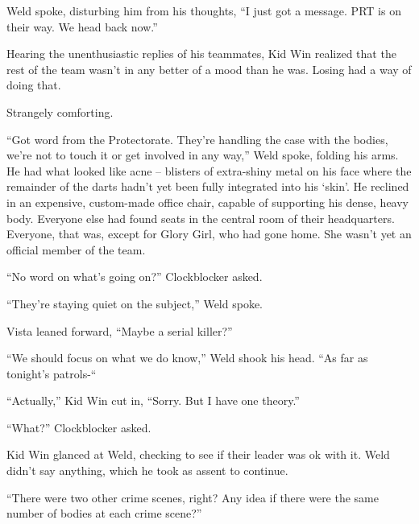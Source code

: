Weld spoke, disturbing him from his thoughts, ``I just got a message.  PRT is on their way.  We head back now.''



Hearing the unenthusiastic replies of his teammates, Kid Win realized that the rest of the team wasn't in any better of a mood than he was.  Losing had a way of doing that.



Strangely comforting.



\sectionbreak



``Got word from the Protectorate.  They're handling the case with the bodies, we're not to touch it or get involved in any way,'' Weld spoke, folding his arms.  He had what looked like acne – blisters of extra-shiny metal on his face where the remainder of the darts hadn't yet been fully integrated into his `skin'.  He reclined in an expensive, custom-made office chair, capable of supporting his dense, heavy body.  Everyone else had found seats in the central room of their headquarters.  Everyone, that was, except for Glory Girl, who had gone home.  She wasn't yet an official member of the team.



``No word on what's going on?'' Clockblocker asked.



``They're staying quiet on the subject,'' Weld spoke.



Vista leaned forward, ``Maybe a serial killer?''



``We should focus on what we do know,'' Weld shook his head. ``As far as tonight's patrols-``



``Actually,'' Kid Win cut in, ``Sorry.  But I have one theory.''



``What?'' Clockblocker asked.



Kid Win glanced at Weld, checking to see if their leader was ok with it.  Weld didn't say anything, which he took as assent to continue.



``There were two other crime scenes, right?  Any idea if there were the same number of bodies at each crime scene?''



